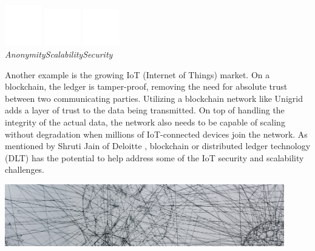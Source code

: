\documentclass{article}
\begin{document}
\begin{center}
\includegraphics[width=45pt]{anonymous}
\hspace{1.5cm}
\includegraphics[width=45pt]{scalability}
\hspace{1.5cm}
\includegraphics[width=45pt]{security}
\\
\vspace{0.1cm}
\hspace{0pt}\emph{Anonymity}\hspace{50pt}\emph{Scalability}\hspace{57pt}\emph{Security}\hspace{10pt}
\end{center}

\noindent Another example is the growing IoT (Internet of Things) market. On a blockchain, the ledger is tamper-proof, removing the need for absolute trust between two communicating parties. Utilizing a blockchain network like Unigrid adds a layer of trust to the data being transmitted. On top of handling the integrity of the actual data, the network also needs to be capable of scaling without degradation when millions of IoT-connected devices join the network. As mentioned by Shruti Jain of Deloitte \cite{jain2021}, blockchain or distributed ledger technology (DLT) has the potential to help address some of the IoT security and scalability challenges.

\begin{mdframed}[style=textimage]
	\includegraphics[width=345pt]{communication} 
\end{mdframed}
\end{document}
